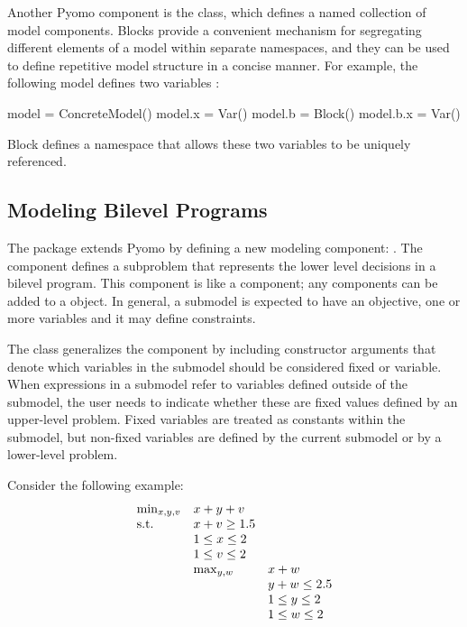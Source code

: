 Another Pyomo component is the  class, which defines a
named collection of model components.  Blocks provide a convenient
mechanism for segregating different elements of a model within
separate namespaces, and they can be used to define repetitive model
structure in a concise manner.  For example, the following model
defines two variables :
\begin{qlisting}
model = ConcreteModel()
model.x = Var()
model.b = Block()
model.b.x = Var()
\end{qlisting}
Block  defines a namespace that allows these two variables to be
uniquely referenced.

\subsection{Modeling Bilevel Programs}

The  package extends Pyomo by defining a new
modeling component: .  The  component
defines a subproblem that represents the lower level decisions in
a bilevel program.  This component is like a  component;
any components can be added to a  object.  In general,
a submodel is expected to have an objective, one or more variables
and it may define constraints.

The  class generalizes the  component
by including constructor arguments that denote which variables in
the submodel should be considered fixed or variable.  When expressions
in a submodel refer to variables defined outside of the submodel,
the user needs to indicate whether these are fixed values defined
by an upper-level problem.  Fixed variables are treated as constants
within the submodel, but non-fixed variables are defined by the
current submodel or by a lower-level problem.

Consider the following example:
\begin{equation}
\begin{array}{lll}
\min_{x, y, v}      & x + y + v & \\
\textrm{s.t.}                 & x + v \geq 1.5 \\
                    & 1 \leq x \leq 2 &\\
                    & 1 \leq v \leq 2 & \\
                    & \max_{y,w}  & x + w\\
                    &           & y + w \leq 2.5 \\
                    &           & 1 \leq y \leq 2\\
                    &           & 1 \leq w \leq 2
\end{array}
\end{equation}

